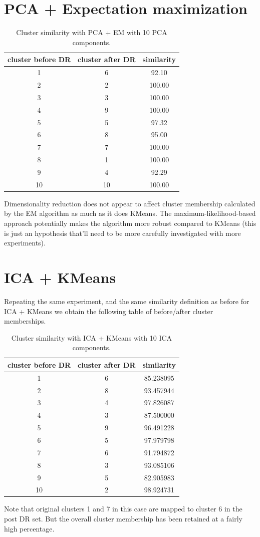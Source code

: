 \documentclass[10pt,letterpaper]{article}
\begin{document}
\section{PCA + Expectation maximization}
\begin{table}[tbp]
\begin{center}
\begin{tabular}{c|c|c }
\hline
{\bf cluster before DR}&{\bf cluster after DR}&{\bf similarity} \\ \hline
 1 & 6 & 92.10\\ 
 2 & 2 & 100.00\\ 
 3 & 3 & 100.00\\ 
 4 & 9 & 100.00\\ 
 5 & 5 & 97.32\\ 
 6 & 8 & 95.00\\ 
 7 & 7 & 100.00\\ 
 8 & 1 & 100.00\\ 
 9 & 4 &92.29\\ 
 10 & 10 & 100.00 \\ \hline 
\end{tabular}
\end{center}
\caption{Cluster similarity with PCA + EM with 10 PCA components. \label{empca}}
\end{table}
Dimensionality reduction does not appear to affect cluster membership calculated by the EM algorithm as much as it does KMeans. The maximum-likelihood-based approach potentially makes the algorithm more robust compared to KMeans (this is just an hypothesis that'll need to be more carefully investigated with more experiments).
\section{ICA + KMeans}
Repeating the same experiment, and the same similarity definition as before for ICA + KMeans we obtain the following table of before/after cluster memberships.
\begin{table}[tbp]
\begin{center}
\begin{tabular}{c|c|c }
\hline
{\bf cluster before DR}&{\bf cluster after DR}&{\bf similarity} \\ \hline
1 & 6 & 85.238095\\
2 & 8 & 93.457944\\
3 & 4 & 97.826087\\
4 & 3 & 87.500000\\
5 & 9 & 96.491228\\
6 & 5 & 97.979798\\
7 & 6 & 91.794872\\
8 & 3 & 93.085106\\
9 & 5 & 82.905983\\
10 & 2 & 98.924731 \\ \hline
\end{tabular}
\end{center}
\caption{Cluster similarity with ICA + KMeans with 10 ICA components. \label{kmica}}
\end{table}
Note that original clusters 1 and 7 in this case are mapped to cluster 6 in the post DR set. But the overall cluster membership has been retained at a fairly high percentage.
\end{document}
